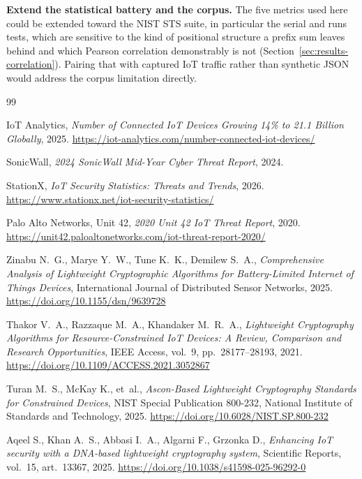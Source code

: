 \documentclass[12pt,a4paper,twoside]{report}
\numberwithin{equation}{chapter}
\begin{document}
\textbf{Extend the statistical battery and the corpus.} The five
metrics used here could be extended toward the NIST STS suite, in
particular the serial and runs tests, which are sensitive to the kind
of positional structure a prefix sum leaves behind and which
Pearson correlation demonstrably is not
(Section~\ref{sec:results-correlation}). Pairing that with captured IoT
traffic rather than synthetic JSON would address the corpus
limitation directly.

\begin{thebibliography}{99}

IoT Analytics,
\emph{Number of Connected IoT Devices Growing 14\% to 21.1 Billion
Globally}, 2025.
\url{https://iot-analytics.com/number-connected-iot-devices/}

SonicWall,
\emph{2024 SonicWall Mid-Year Cyber Threat Report}, 2024.

StationX,
\emph{IoT Security Statistics: Threats and Trends}, 2026.
\url{https://www.stationx.net/iot-security-statistics/}

Palo Alto Networks, Unit 42,
\emph{2020 Unit 42 IoT Threat Report}, 2020.
\url{https://unit42.paloaltonetworks.com/iot-threat-report-2020/}

Zinabu N.~G., Marye Y.~W., Tune K.~K., Demilew S.~A.,
\emph{Comprehensive Analysis of Lightweight Cryptographic Algorithms
for Battery-Limited Internet of Things Devices}, International Journal
of Distributed Sensor Networks, 2025.
\url{https://doi.org/10.1155/dsn/9639728}

Thakor V.~A., Razzaque M.~A., Khandaker M.~R.~A.,
\emph{Lightweight Cryptography Algorithms for Resource-Constrained IoT
Devices: A Review, Comparison and Research Opportunities}, IEEE Access,
vol.~9, pp.~28177--28193, 2021.
\url{https://doi.org/10.1109/ACCESS.2021.3052867}

Turan M.~S., McKay K., et~al.,
\emph{Ascon-Based Lightweight Cryptography Standards for Constrained
Devices}, NIST Special Publication 800-232, National Institute of
Standards and Technology, 2025.
\url{https://doi.org/10.6028/NIST.SP.800-232}

Aqeel S., Khan A.~S., Abbasi I.~A., Algarni F., Grzonka D.,
\emph{Enhancing IoT security with a DNA-based lightweight cryptography
system}, Scientific Reports, vol.~15, art.~13367, 2025.
\url{https://doi.org/10.1038/s41598-025-96292-0}


\end{thebibliography}
\end{document}
